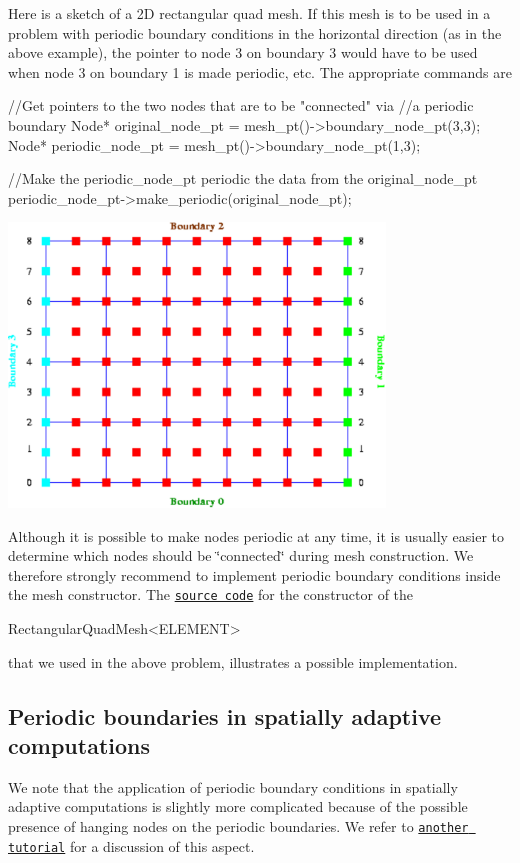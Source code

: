 Here is a sketch of a 2D rectangular quad mesh. If this mesh is to be used in a problem with periodic boundary conditions in the horizontal direction (as in the above example), the pointer to node 3 on boundary 3 would have to be used when node 3 on boundary 1 is made periodic, etc. The appropriate commands are 
\begin{DoxyCode}
\textcolor{comment}{//Get pointers to the two nodes that are to be "connected" via}
\textcolor{comment}{//a periodic boundary}
Node* original\_node\_pt = mesh\_pt()->boundary\_node\_pt(3,3);
Node* periodic\_node\_pt = mesh\_pt()->boundary\_node\_pt(1,3);

\textcolor{comment}{//Make the periodic\_node\_pt periodic the data from the original\_node\_pt}
periodic\_node\_pt->make\_periodic(original\_node\_pt);
\end{DoxyCode}


 
\begin{DoxyImage}
\includegraphics[width=0.75\textwidth]{periodic_mesh}
\end{DoxyImage}


Although it is possible to make nodes periodic at any time, it is usually easier to determine which nodes should be \char`\"{}connected\char`\"{} during mesh construction. We therefore strongly recommend to implement periodic boundary conditions inside the mesh constructor. The \href{../../../../src/meshes/rectangular_quadmesh.template.cc}{\tt source code} for the constructor of the


\begin{DoxyCode}
RectangularQuadMesh<ELEMENT>
\end{DoxyCode}


that we used in the above problem, illustrates a possible implementation.\hypertarget{index_periodic_adapt}{}\subsection{Periodic boundaries in spatially adaptive computations}\label{index_periodic_adapt}
We note that the application of periodic boundary conditions in spatially adaptive computations is slightly more complicated because of the possible presence of hanging nodes on the periodic boundaries. We refer to \href{../../../linear_elasticity/refineable_periodic_load/html/index.html}{\tt another tutorial} for a discussion of this aspect.



